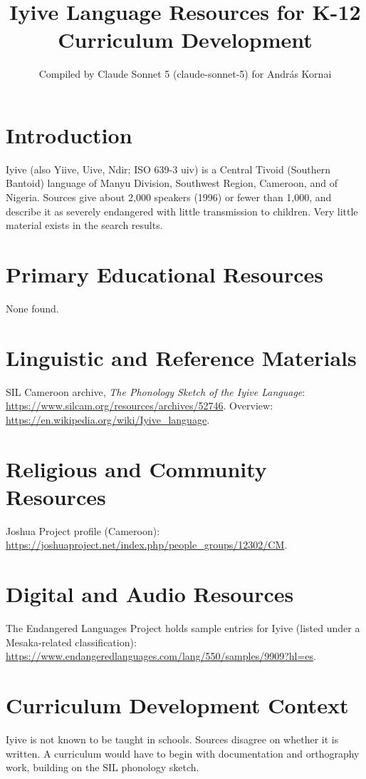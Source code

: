 \documentclass[12pt]{article}
\title{Iyive Language Resources for K-12 Curriculum Development}
\author{Compiled by Claude Sonnet 5 (claude-sonnet-5) for Andr\'as Kornai}
\date{}
\begin{document}
\maketitle

\section{Introduction}
Iyive (also Yiive, Uive, Ndir; ISO 639-3 uiv) is a Central Tivoid (Southern Bantoid) language of Manyu Division, Southwest Region, Cameroon, and of Nigeria. Sources give about 2,000 speakers (1996) or fewer than 1,000, and describe it as severely endangered with little transmission to children. Very little material exists in the search results.

\section{Primary Educational Resources}
None found.

\section{Linguistic and Reference Materials}
SIL Cameroon archive, \emph{The Phonology Sketch of the Iyive Language}: \url{https://www.silcam.org/resources/archives/52746}. Overview: \url{https://en.wikipedia.org/wiki/Iyive_language}.

\section{Religious and Community Resources}
Joshua Project profile (Cameroon): \url{https://joshuaproject.net/index.php/people_groups/12302/CM}.

\section{Digital and Audio Resources}
The Endangered Languages Project holds sample entries for Iyive (listed under a Mesaka-related classification): \url{https://www.endangeredlanguages.com/lang/550/samples/9909?hl=es}.

\section{Curriculum Development Context}
Iyive is not known to be taught in schools. Sources disagree on whether it is written. A curriculum would have to begin with documentation and orthography work, building on the SIL phonology sketch.
\end{document}
